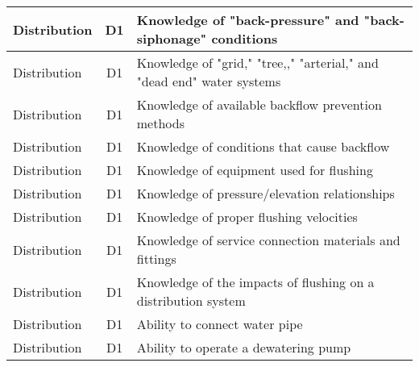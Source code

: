 \documentclass{article}
\begin{document}
\begin{table}[]
\begin{tabular}{|l|c|l|}
Distribution                           & D1             & Knowledge of   "back-pressure" and "back-siphonage" conditions                                                                    \\ \hline
Distribution                           & D1             & Knowledge of   "grid," "tree,," "arterial," and "dead   end" water systems                                                        \\ \hline
Distribution                           & D1             & Knowledge of   available backflow prevention methods                                                                              \\ \hline
Distribution                           & D1             & Knowledge of   conditions that cause backflow                                                                                     \\ \hline
Distribution                           & D1             & Knowledge of   equipment used for flushing                                                                                        \\ \hline
Distribution                           & D1             & Knowledge of   pressure/elevation relationships                                                                                   \\ \hline
Distribution                           & D1             & Knowledge of proper   flushing velocities                                                                                         \\ \hline
Distribution                           & D1             & Knowledge of service   connection materials and fittings                                                                          \\ \hline
Distribution                           & D1             & Knowledge of the   impacts of flushing on a distribution system                                                                   \\ \hline
Distribution                           & D1             & Ability to connect   water pipe                                                                                                   \\ \hline
Distribution                           & D1             & Ability to operate a   dewatering pump                                                                                            \\ \hline

\end{tabular}
\end{table}
\end{document}
